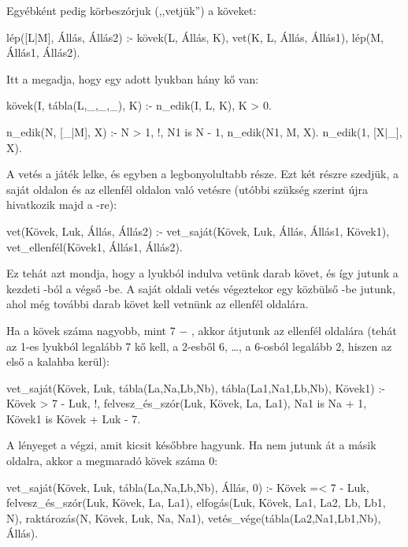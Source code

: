 Egyébként pedig körbeszórjuk (,,vetjük'') a köveket:
\begin{program}
lép([L|M], Állás, Állás2) :-
    kövek(L, Állás, K),
    vet(K, L, Állás, Állás1),
    lép(M, Állás1, Állás2).
\end{program}

Itt a  megadja, hogy egy adott lyukban
hány kő van:
\begin{program}
kövek(I, tábla(L,_,_,_), K) :-
    n_edik(I, L, K), K > 0.

n_edik(N, [_|M], X) :-
    N > 1, !, N1 is N - 1,
    n_edik(N1, M, X).
n_edik(1, [X|_], X).
\end{program}

A vetés a játék lelke, és egyben a legbonyolultabb
része. Ezt két részre szedjük, a saját oldalon és az
ellenfél oldalon való vetésre (utóbbi szükség
szerint újra hivatkozik majd a -re):
\begin{program}
vet(Kövek, Luk, Állás, Állás2) :-
    vet_saját(Kövek, Luk, Állás, Állás1, Kövek1),
    vet_ellenfél(Kövek1, Állás1, Állás2).
\end{program}

Ez tehát azt mondja, hogy a  lyukból indulva
vetünk  darab követ, és így jutunk a
kezdeti -ból a végső -be. A
saját oldali vetés végeztekor egy közbülső
-be jutunk, ahol még további 
darab követ kell vetnünk az ellenfél oldalára.

Ha a kövek száma nagyobb, mint 7 $-$ , akkor
átjutunk az ellenfél oldalára (tehát az 1-es lyukból
legalább 7 kő kell, a 2-esből 6, \dots, a 6-osból
legalább 2, hiszen az első a kalahba kerül):
\begin{program}
vet_saját(Kövek, Luk, tábla(La,Na,Lb,Nb),
          tábla(La1,Na1,Lb,Nb), Kövek1) :-
    Kövek > 7 - Luk, !, %
    felvesz_és_szór(Luk, Kövek, La, La1),
    Na1 is Na + 1, Kövek1 is Kövek + Luk - 7.
\end{program}

A lényeget a  végzi, amit
kicsit későbbre hagyunk. Ha nem jutunk át a másik
oldalra, akkor a megmaradó kövek száma 0:
\begin{program}
vet_saját(Kövek, Luk,
          tábla(La,Na,Lb,Nb), Állás, 0) :-
    Kövek =< 7 - Luk,
    felvesz_és_szór(Luk, Kövek, La, La1),
    elfogás(Luk, Kövek, La1, La2, Lb, Lb1, N),
    raktározás(N, Kövek, Luk, Na, Na1),
    vetés_vége(tábla(La2,Na1,Lb1,Nb), Állás).
\end{program}

